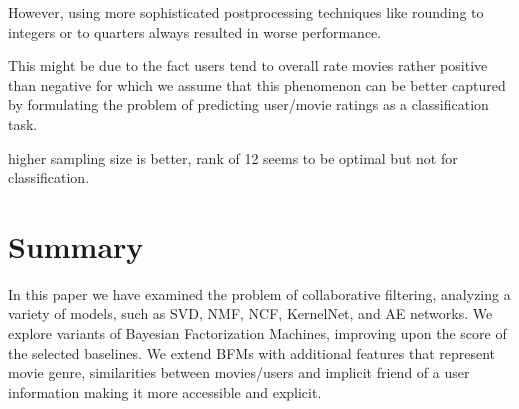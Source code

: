 \documentclass[10pt,conference,compsocconf]{IEEEtran}
\begin{document}
    However, using more sophisticated postprocessing techniques like rounding to integers or to quarters always resulted in worse performance.

    This might be due to the fact users tend to overall rate movies rather positive than negative for which we assume that this phenomenon can be better captured by formulating the problem of predicting user/movie ratings as a classification task.


    higher sampling size is better, rank of 12 seems to be optimal but not for classification.


    \section{Summary}

    In this paper we have examined the problem of collaborative filtering, analyzing a variety of models, such as SVD, NMF, NCF, KernelNet, and AE networks.
    We explore variants of Bayesian Factorization Machines, improving upon the score of the selected baselines.
    We extend BFMs with additional features that represent movie genre, similarities between movies/users and implicit friend of a user information making it more accessible and explicit.



    \balance
    
    
\end{document}
